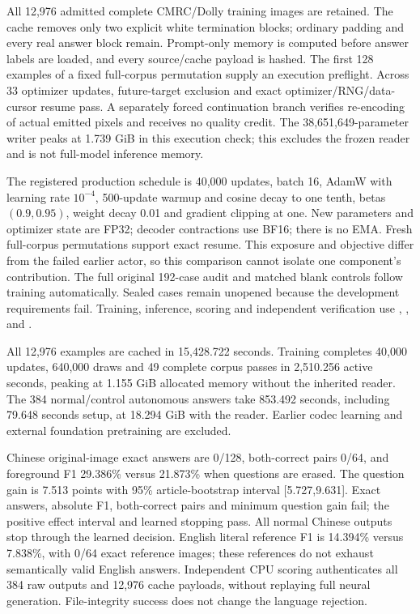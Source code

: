 \documentclass[10pt,a4paper]{article}
\begin{document}
All 12,976 admitted complete CMRC/Dolly training images are retained. The
cache removes only two explicit white termination blocks; ordinary padding
and every real answer block remain. Prompt-only memory is computed before
answer labels are loaded, and every source/cache payload is hashed. The
first 128 examples of a fixed full-corpus permutation supply an execution
preflight. Across 33 optimizer updates, future-target exclusion and exact
optimizer/RNG/data-cursor resume pass. A separately forced continuation branch
verifies re-encoding of actual emitted pixels and receives no quality credit.
The 38,651,649-parameter writer peaks at 1.739 GiB in this execution check;
this excludes the frozen reader and is not full-model inference memory.

The registered production schedule is 40,000 updates, batch 16, AdamW with
learning rate $10^{-4}$, 500-update warmup and cosine decay to one tenth,
betas $(0.9,0.95)$, weight decay 0.01 and gradient clipping at one. New
parameters and optimizer state are FP32; decoder contractions use BF16;
there is no EMA. Fresh full-corpus permutations support exact resume. This
exposure and objective differ from the failed earlier actor, so this
comparison cannot isolate one component's contribution. The full original
192-case audit and matched blank controls follow training automatically.
Sealed cases remain unopened because the development requirements fail.
Training, inference, scoring and independent verification use
,
,
 and
.

All 12,976 examples are cached in 15,428.722 seconds. Training completes
40,000 updates, 640,000 draws and 49 complete corpus passes in 2,510.256
active seconds, peaking at 1.155 GiB allocated memory without the inherited
reader. The 384 normal/control autonomous answers take 853.492 seconds,
including 79.648 seconds setup, at 18.294 GiB with the reader. Earlier
codec learning and external foundation pretraining are excluded.

Chinese original-image exact answers are 0/128, both-correct pairs 0/64,
and foreground F1 29.386\% versus 21.873\% when questions are erased.
The question gain is 7.513 points with 95\% article-bootstrap interval
[5.727,9.631]. Exact answers, absolute F1, both-correct pairs and minimum
question gain fail; the positive effect interval and learned stopping pass.
All normal Chinese outputs stop through the learned decision. English literal
reference F1 is 14.394\% versus 7.838\%, with 0/64 exact reference images;
these references do not exhaust semantically valid English answers.
Independent CPU scoring authenticates all 384 raw outputs and 12,976 cache
payloads, without replaying full neural generation. File-integrity success
does not change the language rejection.
\end{document}
